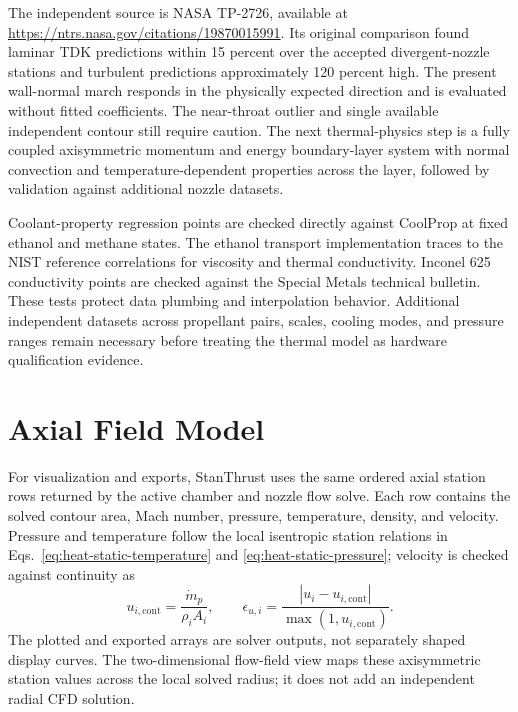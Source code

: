 \documentclass[11pt]{article}
\newcommand{\mdotp}{\dot{m}_{p}}
\begin{document}
The independent source is NASA TP-2726, available at \url{https://ntrs.nasa.gov/citations/19870015991}. Its original comparison found laminar TDK predictions within 15 percent over the accepted divergent-nozzle stations and turbulent predictions approximately 120 percent high. The present wall-normal march responds in the physically expected direction and is evaluated without fitted coefficients. The near-throat outlier and single available independent contour still require caution. The next thermal-physics step is a fully coupled axisymmetric momentum and energy boundary-layer system with normal convection and temperature-dependent properties across the layer, followed by validation against additional nozzle datasets.

Coolant-property regression points are checked directly against CoolProp at fixed ethanol and methane states. The ethanol transport implementation traces to the NIST reference correlations for viscosity and thermal conductivity. Inconel 625 conductivity points are checked against the Special Metals technical bulletin. These tests protect data plumbing and interpolation behavior. Additional independent datasets across propellant pairs, scales, cooling modes, and pressure ranges remain necessary before treating the thermal model as hardware qualification evidence.

\section{Axial Field Model}
For visualization and exports, StanThrust uses the same ordered axial station rows returned by the active chamber and nozzle flow solve. Each row contains the solved contour area, Mach number, pressure, temperature, density, and velocity. Pressure and temperature follow the local isentropic station relations in Eqs.~\eqref{eq:heat-static-temperature} and \eqref{eq:heat-static-pressure}; velocity is checked against continuity as
\begin{equation}
u_{i,\mathrm{cont}}=\frac{\mdotp}{\rho_i A_i},
\qquad
\epsilon_{u,i}=\frac{|u_i-u_{i,\mathrm{cont}}|}{\max(1,u_{i,\mathrm{cont}})}.
\label{eq:axial-continuity-check}
\end{equation}
The plotted and exported arrays are solver outputs, not separately shaped display curves. The two-dimensional flow-field view maps these axisymmetric station values across the local solved radius; it does not add an independent radial CFD solution.
\end{document}

